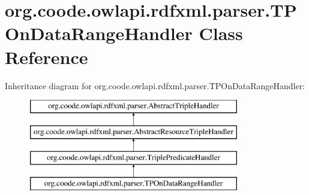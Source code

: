 \hypertarget{classorg_1_1coode_1_1owlapi_1_1rdfxml_1_1parser_1_1_t_p_on_data_range_handler}{\section{org.\-coode.\-owlapi.\-rdfxml.\-parser.\-T\-P\-On\-Data\-Range\-Handler Class Reference}
\label{classorg_1_1coode_1_1owlapi_1_1rdfxml_1_1parser_1_1_t_p_on_data_range_handler}
}
Inheritance diagram for org.\-coode.\-owlapi.\-rdfxml.\-parser.\-T\-P\-On\-Data\-Range\-Handler\-:\begin{figure}[H]
\begin{center}
\leavevmode
\includegraphics[height=4.000000cm]{classorg_1_1coode_1_1owlapi_1_1rdfxml_1_1parser_1_1_t_p_on_data_range_handler}
\end{center}
\end{figure}
